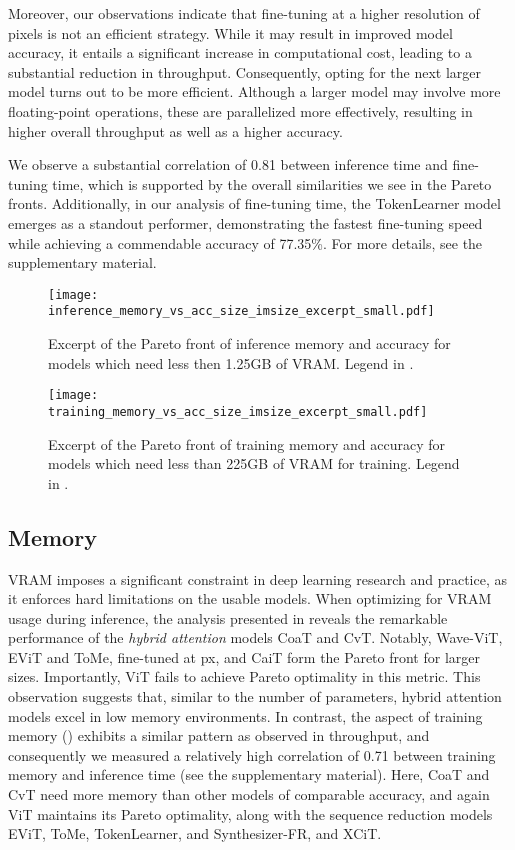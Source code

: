 Moreover, our observations indicate that fine-tuning at a higher resolution of  pixels is not an efficient strategy. 
While it may result in improved model accuracy, it entails a significant increase in computational cost, leading to a substantial reduction in throughput. 
Consequently, opting for the next larger model turns out to be more efficient. 
Although a larger model may involve more floating-point operations, these are parallelized more effectively, resulting in higher overall throughput as well as a higher  accuracy.

We observe a substantial correlation of 0.81 between inference time and fine-tuning time, which is supported by the overall similarities we see in the Pareto fronts.
Additionally, in our analysis of fine-tuning time, the TokenLearner model emerges as a standout performer, demonstrating the fastest fine-tuning speed while achieving a commendable accuracy of 77.35\%.
For more details, see the supplementary material.


\begin{figure}[ht]
	\centering
	\texttt{[image: inference\_memory\_vs\_acc\_size\_imsize\_excerpt\_small.pdf]}
	\caption{Excerpt of the Pareto front of inference memory and accuracy for models which need less then 1.25GB of VRAM. Legend in .}
	\label{fig:inference_memory_vs_acc_size_imsize}
\end{figure}
\begin{figure}[ht]
	\centering
	\texttt{[image: training\_memory\_vs\_acc\_size\_imsize\_excerpt\_small.pdf]}
	\caption{Excerpt of the Pareto front of training memory and accuracy for models which need less than 225GB of VRAM for training. Legend in .}
	\label{fig:training_memory_vs_acc_size_imsize}
\end{figure}

\subsection{Memory}
VRAM imposes a significant constraint in deep learning research and practice, as it enforces hard limitations on the usable models.
When optimizing for VRAM usage during inference, the analysis presented in  reveals the remarkable performance of the \emph{hybrid attention} models CoaT and CvT.
Notably, Wave-ViT, 
EViT and ToMe, fine-tuned at 
 px, and CaiT form the Pareto front for larger sizes. 
Importantly, ViT fails to achieve Pareto optimality in this metric.
This observation suggests that, similar to the number of parameters, hybrid attention models excel in low memory environments.
In contrast, the aspect of training memory () exhibits a similar pattern as observed in throughput, and consequently we measured a relatively high correlation of 0.71 between training memory and inference time (see the supplementary material).
Here, CoaT and CvT need more memory than other models of comparable accuracy, and again 
ViT maintains its Pareto optimality, along with the sequence reduction models EViT, ToMe, TokenLearner, and Synthesizer-FR, and XCiT. 

